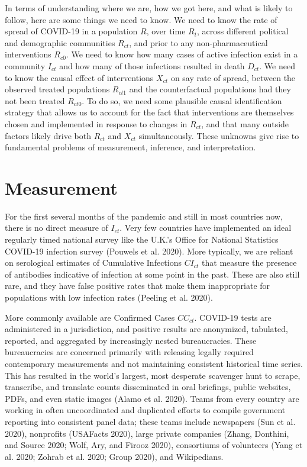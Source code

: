 \documentclass[10pt,letterpaper]{article}
\begin{document}
In terms of understanding where we are, how we got here, and what is
likely to follow, here are some things we need to know. We need to know
the rate of spread of COVID-19 in a population \(R\), over time
\(R_{t}\), across different political and demographic communities
\(R_{ct}\), and prior to any non-pharmaceutical interventions
\(R_{c0}\). We need to know how many cases of active infection exist in
a community \(I_{ct}\) and how many of those infections resulted in
death \(D_{ct}\). We need to know the causal effect of interventions
\(X_{ct}\) on say rate of spread, between the observed treated
populations \(R_{ct1}\) and the counterfactual populations had they not
been treated \(R_{ct0}\). To do so, we need some plausible causal
identification strategy that allows us to account for the fact that
interventions are themselves chosen and implemented in response to
changes in \(R_{ct}\), and that many outside factors likely drive both
\(R_{ct}\) and \(X_{ct}\) simultaneously. These unknowns give rise to
fundamental problems of measurement, inference, and interpretation.

\hypertarget{measurement}{%
\section{Measurement}\label{measurement}}

For the first several months of the pandemic and still in most countries
now, there is no direct measure of \(I_{ct}\). Very few countries have
implemented an ideal regularly timed national survey like the U.K.'s
Office for National Statistics COVID-19 infection survey (Pouwels et al.
2020). More typically, we are reliant on serological estimates of
Cumulative Infections \(CI_{ct}\) that measure the presence of
antibodies indicative of infection at some point in the past. These are
also still rare, and they have false positive rates that make them
inappropriate for populations with low infection rates (Peeling et al.
2020).

More commonly available are Confirmed Cases \(CC_{ct}\). COVID-19 tests
are administered in a jurisdiction, and positive results are anonymized,
tabulated, reported, and aggregated by increasingly nested
bureaucracies. These bureaucracies are concerned primarily with
releasing legally required contemporary measurements and not maintaining
consistent historical time series. This has resulted in the world's
largest, most desperate scavenger hunt to scrape, transcribe, and
translate counts disseminated in oral briefings, public websites, PDFs,
and even static images (Alamo et al. 2020). Teams from every country are
working in often uncoordinated and duplicated efforts to compile
government reporting into consistent panel data; these teams include
newspapers (Sun et al. 2020), nonprofits (USAFacts 2020), large private
companies (Zhang, Donthini, and Source 2020; Wolf, Ary, and Firooz
2020), consortiums of volunteers (Yang et al. 2020; Zohrab et al. 2020;
Group 2020), and Wikipedians.
\end{document}
